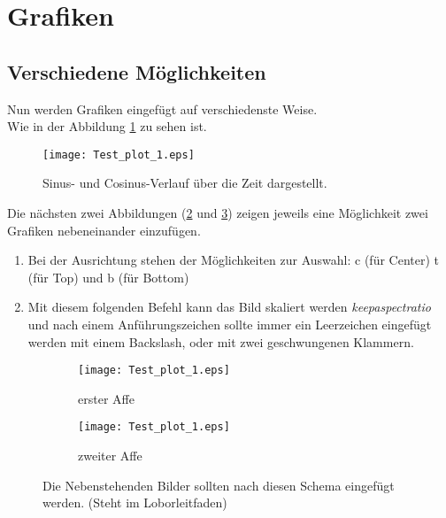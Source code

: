 \section{Grafiken}

\subsection{Verschiedene Möglichkeiten}

Nun werden Grafiken eingefügt auf verschiedenste Weise.\\
Wie in der Abbildung \cref{fig:test_plot_1} zu sehen ist.

\begin{figure}[!ht]
	\centering
	\texttt{[image: Test\_plot\_1.eps]}
	\caption[60\,\% der Textbreite]{Sinus- und Cosinus-Verlauf über die Zeit dargestellt.\cite{Sensoren}}
	\label{fig:test_plot_1}
\end{figure}


\clearpage
Die nächsten zwei Abbildungen (\cref{fig:subhouse21} und \cref{fig:subhouse22}) zeigen jeweils eine Möglichkeit zwei Grafiken nebeneinander einzufügen.\cite{Sensoren}
\begin{enumerate}
	\item Bei der Ausrichtung stehen der Möglichkeiten zur Auswahl: c (für Center) t (für Top) und b (für Bottom)
	\item Mit diesem folgenden Befehl kann das Bild skaliert werden \glqq\textit{keepaspectratio}\grqq{} und nach einem Anführungszeichen sollte immer ein Leerzeichen eingefügt werden mit einem Backslash, oder mit zwei geschwungenen Klammern.
\end{enumerate}

\clearpage
\begin{figure}[!ht]
	\begin{subfigure}[b]{.48\textwidth}
		\centering
		\texttt{[image: Test\_plot\_1.eps]}
		\caption{erster Affe}
		\label{fig:subhouse21}
	\end{subfigure}
	\hfil
	\begin{subfigure}[b]{.48\textwidth}
		\centering
		\texttt{[image: Test\_plot\_1.eps]}
		\caption{zweiter Affe}
		\label{fig:subhouse22}
	\end{subfigure}
	\caption[zwei Pferde]{Die Nebenstehenden Bilder sollten nach diesen Schema eingefügt werden. (Steht im Loborleitfaden)}    
	\label{fig:Doppelbild}
\end{figure}

